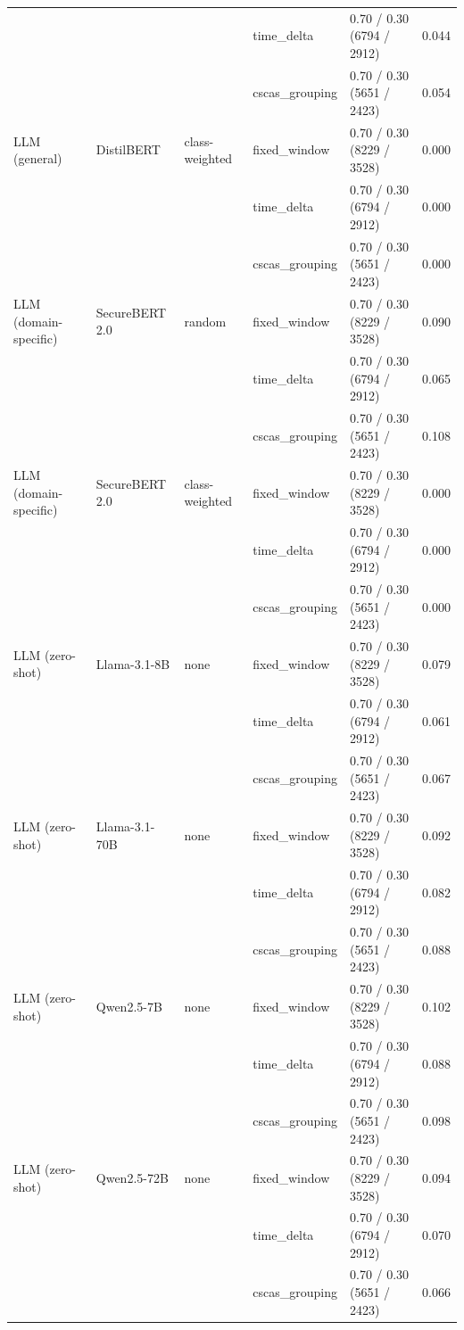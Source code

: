 \begin{table}[htbp]
{\begin{tabular}{lllllc}
 &  &  & time\_delta & 0.70 / 0.30 (6794 / 2912) & 0.044 \\
 &  &  & cscas\_grouping & 0.70 / 0.30 (5651 / 2423) & 0.054 \\
\addlinespace
LLM (general) & DistilBERT & class-weighted & fixed\_window & 0.70 / 0.30 (8229 / 3528) & 0.000 \\
 &  &  & time\_delta & 0.70 / 0.30 (6794 / 2912) & 0.000 \\
 &  &  & cscas\_grouping & 0.70 / 0.30 (5651 / 2423) & 0.000 \\
\addlinespace
LLM (domain-specific) & SecureBERT 2.0 & random & fixed\_window & 0.70 / 0.30 (8229 / 3528) & 0.090 \\
 &  &  & time\_delta & 0.70 / 0.30 (6794 / 2912) & 0.065 \\
 &  &  & cscas\_grouping & 0.70 / 0.30 (5651 / 2423) & 0.108 \\
\addlinespace
LLM (domain-specific) & SecureBERT 2.0 & class-weighted & fixed\_window & 0.70 / 0.30 (8229 / 3528) & 0.000 \\
 &  &  & time\_delta & 0.70 / 0.30 (6794 / 2912) & 0.000 \\
 &  &  & cscas\_grouping & 0.70 / 0.30 (5651 / 2423) & 0.000 \\
\addlinespace
LLM (zero-shot) & Llama-3.1-8B & none & fixed\_window & 0.70 / 0.30 (8229 / 3528) & 0.079 \\
 &  &  & time\_delta & 0.70 / 0.30 (6794 / 2912) & 0.061 \\
 &  &  & cscas\_grouping & 0.70 / 0.30 (5651 / 2423) & 0.067 \\
\addlinespace
LLM (zero-shot) & Llama-3.1-70B & none & fixed\_window & 0.70 / 0.30 (8229 / 3528) & 0.092 \\
 &  &  & time\_delta & 0.70 / 0.30 (6794 / 2912) & 0.082 \\
 &  &  & cscas\_grouping & 0.70 / 0.30 (5651 / 2423) & 0.088 \\
\addlinespace
LLM (zero-shot) & Qwen2.5-7B & none & fixed\_window & 0.70 / 0.30 (8229 / 3528) & 0.102 \\
 &  &  & time\_delta & 0.70 / 0.30 (6794 / 2912) & 0.088 \\
 &  &  & cscas\_grouping & 0.70 / 0.30 (5651 / 2423) & 0.098 \\
\addlinespace
LLM (zero-shot) & Qwen2.5-72B & none & fixed\_window & 0.70 / 0.30 (8229 / 3528) & 0.094 \\
 &  &  & time\_delta & 0.70 / 0.30 (6794 / 2912) & 0.070 \\
 &  &  & cscas\_grouping & 0.70 / 0.30 (5651 / 2423) & 0.066 \\

\end{tabular}}
\end{table}
